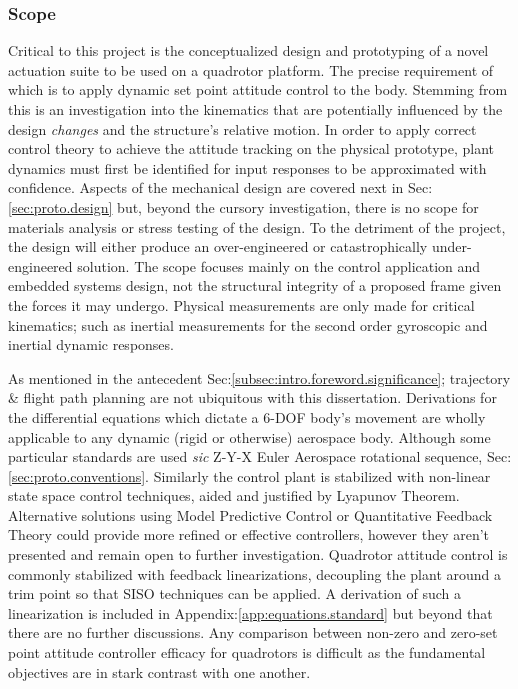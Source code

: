 \subsubsection{Scope}
\label{subsubsec:intro.foreword.scope}
Critical to this project is the conceptualized design and prototyping of a novel actuation suite to be used on a quadrotor platform. The precise requirement of which is to apply dynamic set point attitude control to the body. Stemming from this is an investigation into the kinematics that are potentially influenced by the design \emph{changes} and the structure's relative motion. In order to apply correct control theory to achieve the attitude tracking on the physical prototype, plant dynamics must first be identified for input responses to be approximated with confidence. Aspects of the mechanical design are covered next in Sec:\ref{sec:proto.design} but, beyond the cursory investigation, there is no scope for materials analysis or stress testing of the design. To the detriment of the project, the design will either produce an over-engineered or catastrophically under-engineered solution. The scope focuses mainly on the control application and embedded systems design, not the structural integrity of a proposed frame given the forces it may undergo. Physical measurements are only made for critical kinematics; such as inertial measurements for the second order gyroscopic and inertial dynamic responses.
\par
As mentioned in the antecedent Sec:\ref{subsec:intro.foreword.significance}; trajectory \& flight path planning are not ubiquitous with this dissertation. Derivations for the differential equations which dictate a 6-DOF body's movement are wholly applicable to any dynamic (rigid or otherwise) aerospace body. Although some particular standards are used \emph{sic} Z-Y-X Euler Aerospace rotational sequence, Sec:\ref{sec:proto.conventions}. Similarly the control plant is stabilized with non-linear state space control techniques, aided and justified by Lyapunov Theorem. Alternative solutions using Model Predictive Control or Quantitative Feedback Theory could provide more refined or effective controllers, however they aren't presented and remain open to further investigation. Quadrotor attitude control is commonly stabilized with feedback linearizations, decoupling the plant around a trim point so that SISO techniques can be applied. A derivation of such a linearization is included in Appendix:\ref{app:equations.standard} but beyond that there are no further discussions. Any comparison between non-zero and zero-set point attitude controller efficacy for quadrotors is difficult as the fundamental objectives are in stark contrast with one another.
